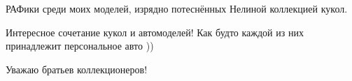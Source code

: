  
 
 
 
 

РАФики среди моих моделей, изрядно потеснённых Нелиной коллекцией кукол.

Интересное сочетание кукол и автомоделей! Как будто каждой из них принадлежит персональное авто ))

Уважаю братьев коллекционеров!
